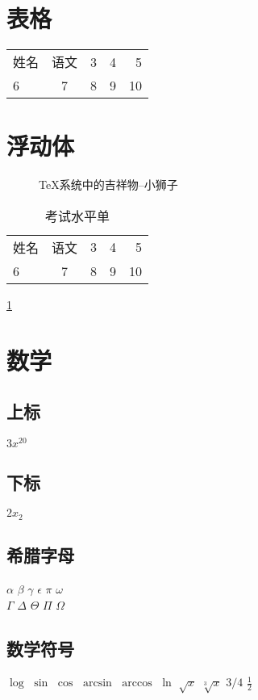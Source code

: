 \documentclass[10pt]{article} %
\begin{document}
	\section{表格} %
		\begin{tabular}{l | c || p{1.5cm} c r}
			\hline \hline%
			姓名 & 语文 & 3 & 4 & 5 \\
			6 & 7 & 8 & 9 & 10
		\end{tabular}
	\section{浮动体}
	\newpage
	\begin{figure}[htbp] %
		\centering %
		\caption{ \TeX 系统中的吉祥物--小狮子} \label{flg-lion}%
	\end{figure}
	\begin{table}[htbp]
		\begin{tabular}{l | c || p{1.5cm} c r}
			\hline \hline%
			姓名 & 语文 & 3 & 4 & 5 \\
			6 & 7 & 8 & 9 & 10
		\end{tabular}
		\caption{考试水平单}\ref{flg-lion} %
	\end{table}
	\section{数学}
	\subsection{上标}
	$3x^{20}$ %
	\subsection{下标}
	$2x_2$
	\subsection{希腊字母}
	$\alpha$
	$\beta$
	$\gamma$
	$\epsilon$
	$\pi$
	$\omega$
	\\
	$\Gamma$
	$\Delta$
	$\Theta$
	$\Pi$
	$\Omega$
	\subsection{数学符号}
	$\log$
	$\sin$
	$\cos$
	$\arcsin$
	$\arccos$
	$\ln$
	$\sqrt{x}$
	$\sqrt[3]{x}$
	$3/4$
	$\frac{1}{2}$
\end{document}

